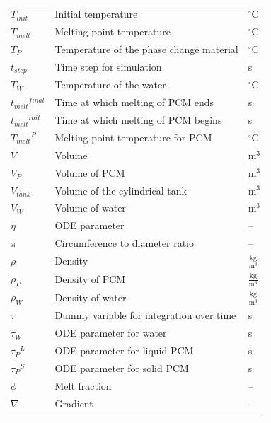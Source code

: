 \documentclass[12pt]{article}
\begin{document}
\begin{longtabu}{l X[l] l}
${T_{init}}$ & Initial temperature & ${}^{\circ}$C
\\
${T_{melt}}$ & Melting point temperature & ${}^{\circ}$C
\\
${T_{P}}$ & Temperature of the phase change material & ${}^{\circ}$C
\\
${t_{step}}$ & Time step for simulation & s
\\
${T_{W}}$ & Temperature of the water & ${}^{\circ}$C
\\
${{t_{melt}}^{final}}$ & Time at which melting of PCM ends & s
\\
${{t_{melt}}^{init}}$ & Time at which melting of PCM begins & s
\\
${{T_{melt}}^{P}}$ & Melting point temperature for PCM & ${}^{\circ}$C
\\
$V$ & Volume & $\text{m}^{3}$
\\
${V_{P}}$ & Volume of PCM & $\text{m}^{3}$
\\
${V_{tank}}$ & Volume of the cylindrical tank & $\text{m}^{3}$
\\
${V_{W}}$ & Volume of water & $\text{m}^{3}$
\\
$η$ & ODE parameter & --
\\
$π$ & Circumference to diameter ratio & --
\\
$ρ$ & Density & $\frac{\text{kg}}{\text{m}^{3}}$
\\
${ρ_{P}}$ & Density of PCM & $\frac{\text{kg}}{\text{m}^{3}}$
\\
${ρ_{W}}$ & Density of water & $\frac{\text{kg}}{\text{m}^{3}}$
\\
$τ$ & Dummy variable for integration over time & s
\\
${τ_{W}}$ & ODE parameter for water & s
\\
${{τ_{P}}^{L}}$ & ODE parameter for liquid PCM & s
\\
${{τ_{P}}^{S}}$ & ODE parameter for solid PCM & s
\\
$ϕ$ & Melt fraction & --
\\
$∇$ & Gradient & --
\\
\bottomrule
\caption{}
\label{Table:ToS}
\end{longtabu}
\end{document}
